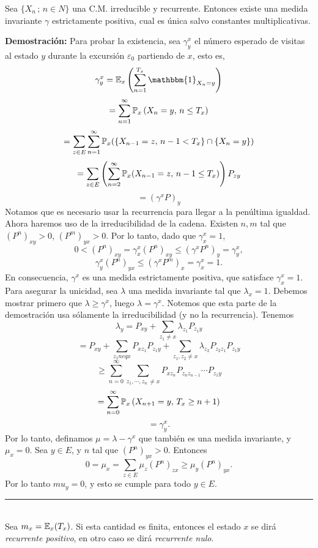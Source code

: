 \begin{teorema}
Sea $\{X_n\,;\,n\in N\}$ una C.M. irreducible y recurrente. Entonces existe una medida invariante $\gamma$ estrictamente positiva, cual es única salvo constantes multiplicativas.
\end{teorema}

\textbf{Demostración: }Para probar la existencia, sea $\gamma_y^x$ el número esperado de visitas al estado $y$ durante la excursión $\varepsilon_0$ partiendo de $x$, esto es,
\[\gamma_y^x = \E_x\left(\sum_{n=1}^{T_x}\mathbbm{1}_{X_n=y}\right)\]
\[= \sum_{n=1}^{\infty}\mathbb{P}_x \left(X_n = y,\, n\leq T_x\right)\]
\[=\sum_{z\in E}\sum_{n=1}^{\infty}\mathbb{P}_x(\{X_{n-1}=z,\,n-1<T_x\}\cap\{X_n = y\})\]
\[=\sum_{z\in E}\left(\sum_{n=2}^{\infty}\mathbb{P}_x(X_{n-1} = z,\,n-1\leq T_x)\right)P_{zy}\]
\[= (\gamma^x P)_y\]
Notamos que es necesario usar la recurrencia para llegar a la penúltima igualdad. Ahora haremos uso de la irreducibilidad de la cadena. Existen $n,m$ tal que $(P^n)_{xy}>0$, $(P^m)_{yx}>0$. Por lo tanto, dado que $\gamma_x^x = 1$,
\[0<(P^n)_{xy} = \gamma_x^x (P^n)_{xy}\leq (\gamma^x P^n)_y = \gamma_y^x,\]
\[\gamma_y^x(P^n)_{yx}\leq (\gamma^x P^m)_x = \gamma_x^x = 1.\]
En consecuencia, $\gamma^x$ es una medida estrictamente positiva, que satisface $\gamma_x^x =1$.\\ Para asegurar la unicidad, sea $\lambda$ una medida invariante tal que $\lambda_x = 1$. Debemos mostrar primero que $\lambda \geq \gamma^x$, luego $\lambda = \gamma^x$. Notemos que esta parte de la demostración usa sólamente la irreducibilidad (y no la recurrencia). Tenemos
\[\lambda_y = P_{xy} + \sum_{z_1 \neq x}\lambda_{z_1}P_{z_1 y}\]
\[= P_{xy} + \sum_{z_1neq x}P_{xz_1}P_{z_1y} + \sum_{z_1,z_2 \neq x}\lambda_{z_2}P_{z_2z_1}P_{z_1y}\]
\[\geq \sum_{n=0}^{\infty}\sum_{z_1,\cdots,z_n\,\neq x}P_{xz_n}P_{z_nz_{n-1}}\cdots P_{z_1y}\]
\[= \sum_{n=0}^{\infty}\mathbb{P}_x\left(X_{n+1} =y,\, T_x \geq n+1\right)\]
\[= \gamma_y^x.\]
Por lo tanto, definamos $\mu = \lambda -\gamma^x$ que también es una medida invariante, y $\mu_x =0$. Sea $y\in E$, y $n$ tal que $(P^n)_{yx}>0$. Entonces
\[0 = \mu_x = \sum_{z \in E}\mu_z(P^n)_{zx} \geq \mu_y(P^n)_{yx}.\]
Por lo tanto $mu_y = 0$, y esto se cumple para todo $y \in E$.\\
\rule{0.7em}{0.7em}\\ \newline
Sea $m_x = \mathbb E_x(T_x)$. Si esta cantidad es finita, entonces el estado $x$ se dirá \textit{recurrente positivo}, en otro caso se dirá \textit{recurrente nulo}.

